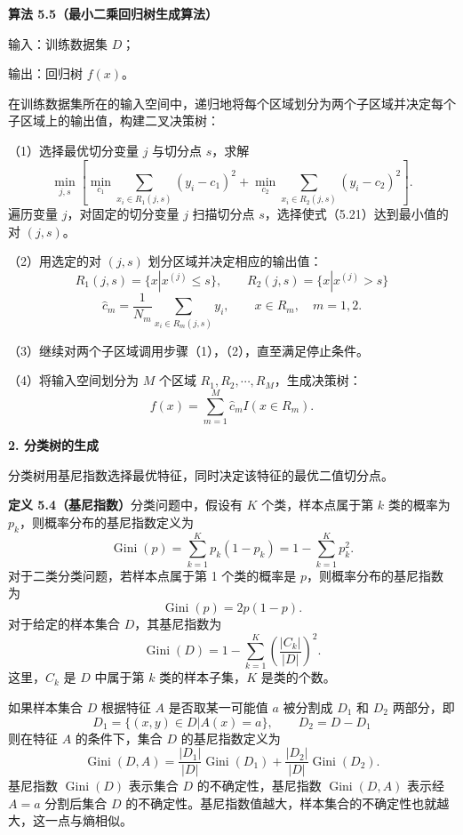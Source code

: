 \documentclass[UTF8,12pt,a4paper,fontset=fandol]{ctexart}
\begin{document}
\noindent\textbf{算法 5.5（最小二乘回归树生成算法）}

输入：训练数据集 $D$；

输出：回归树 $f(x)$。

在训练数据集所在的输入空间中，递归地将每个区域划分为两个子区域并决定每个子区域上的输出值，构建二叉决策树：

（1）选择最优切分变量 $j$ 与切分点 $s$，求解
\begin{equation}
  \min_{j,s}\left[
  \min_{c_1}\sum_{x_i\in R_1(j,s)}(y_i-c_1)^2+
  \min_{c_2}\sum_{x_i\in R_2(j,s)}(y_i-c_2)^2
  \right].
  \tag{5.21}
\end{equation}
遍历变量 $j$，对固定的切分变量 $j$ 扫描切分点 $s$，选择使式（5.21）达到最小值的对 $(j,s)$。

（2）用选定的对 $(j,s)$ 划分区域并决定相应的输出值：
\[
  R_1(j,s)=\{x|x^{(j)}\le s\},\qquad
  R_2(j,s)=\{x|x^{(j)}>s\}
\]
\[
  \hat c_m=\frac{1}{N_m}\sum_{x_i\in R_m(j,s)}y_i,\qquad x\in R_m,\quad m=1,2.
\]

（3）继续对两个子区域调用步骤（1），（2），直至满足停止条件。

（4）将输入空间划分为 $M$ 个区域 $R_1,R_2,\cdots,R_M$，生成决策树：
\[
  f(x)=\sum_{m=1}^{M}\hat c_mI(x\in R_m).
\]

\noindent\textbf{2. 分类树的生成}

分类树用基尼指数选择最优特征，同时决定该特征的最优二值切分点。

\noindent\textbf{定义 5.4（基尼指数）}\quad 分类问题中，假设有 $K$ 个类，样本点属于第 $k$ 类的概率为 $p_k$，则概率分布的基尼指数定义为
\begin{equation}
  \operatorname{Gini}(p)=\sum_{k=1}^{K}p_k(1-p_k)=1-\sum_{k=1}^{K}p_k^2.
  \tag{5.22}
\end{equation}
对于二类分类问题，若样本点属于第 1 个类的概率是 $p$，则概率分布的基尼指数为
\begin{equation}
  \operatorname{Gini}(p)=2p(1-p).
  \tag{5.23}
\end{equation}
对于给定的样本集合 $D$，其基尼指数为
\begin{equation}
  \operatorname{Gini}(D)=1-\sum_{k=1}^{K}\left(\frac{|C_k|}{|D|}\right)^2.
  \tag{5.24}
\end{equation}
这里，$C_k$ 是 $D$ 中属于第 $k$ 类的样本子集，$K$ 是类的个数。

如果样本集合 $D$ 根据特征 $A$ 是否取某一可能值 $a$ 被分割成 $D_1$ 和 $D_2$ 两部分，即
\[
  D_1=\{(x,y)\in D|A(x)=a\},\qquad D_2=D-D_1
\]
则在特征 $A$ 的条件下，集合 $D$ 的基尼指数定义为
\begin{equation}
  \operatorname{Gini}(D,A)=\frac{|D_1|}{|D|}\operatorname{Gini}(D_1)
  +\frac{|D_2|}{|D|}\operatorname{Gini}(D_2).
  \tag{5.25}
\end{equation}
基尼指数 $\operatorname{Gini}(D)$ 表示集合 $D$ 的不确定性，基尼指数 $\operatorname{Gini}(D,A)$ 表示经 $A=a$ 分割后集合 $D$ 的不确定性。基尼指数值越大，样本集合的不确定性也就越大，这一点与熵相似。
\end{document}
